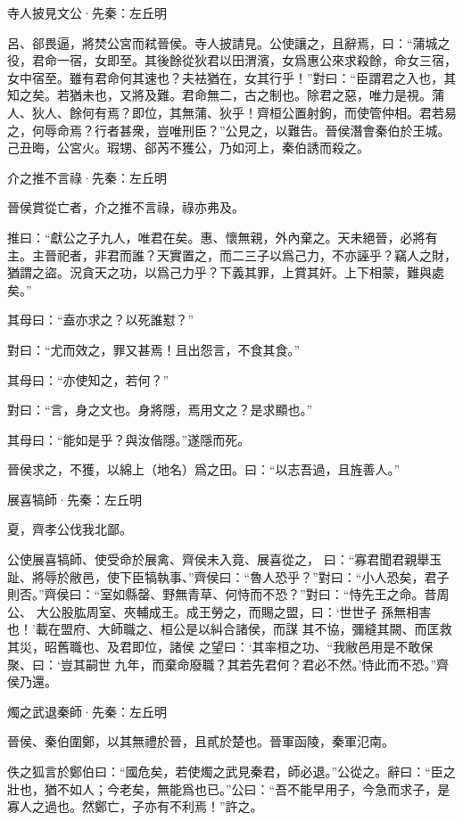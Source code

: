 \documentclass[12pt,a4paper]{ctexbook}
\begin{document}
寺人披見文公·先秦：左丘明 \par
呂、郤畏逼，將焚公宮而弒晉侯。寺人披請見。公使讓之，且辭焉，曰：“蒲城之役，君命一宿，女即至。其後餘從狄君以田渭濱，女爲惠公來求殺餘，命女三宿，女中宿至。雖有君命何其速也？夫袪猶在，女其行乎！”對曰：“臣謂君之入也，其知之矣。若猶未也，又將及難。君命無二，古之制也。除君之惡，唯力是視。蒲人、狄人、餘何有焉？即位，其無蒲、狄乎！齊桓公置射鉤，而使管仲相。君若易之，何辱命焉？行者甚衆，豈唯刑臣？”公見之，以難告。晉侯潛會秦伯於王城。己丑晦，公宮火。瑕甥、郤芮不獲公，乃如河上，秦伯誘而殺之。\par
介之推不言祿·先秦：左丘明 \par
晉侯賞從亡者，介之推不言祿，祿亦弗及。\par
推曰：“獻公之子九人，唯君在矣。惠、懷無親，外內棄之。天未絕晉，必將有主。主晉祀者，非君而誰？天實置之，而二三子以爲己力，不亦誣乎？竊人之財，猶謂之盜。況貪天之功，以爲己力乎？下義其罪，上賞其奸。上下相蒙，難與處矣。”\par
其母曰：“盍亦求之？以死誰懟？”\par
對曰：“尤而效之，罪又甚焉！且出怨言，不食其食。”\par
其母曰：“亦使知之，若何？”\par
對曰：“言，身之文也。身將隱，焉用文之？是求顯也。”\par
其母曰：“能如是乎？與汝偕隱。”遂隱而死。\par
晉侯求之，不獲，以綿上（地名）爲之田。曰：“以志吾過，且旌善人。”\par
展喜犒師·先秦：左丘明 \par
夏，齊孝公伐我北鄙。\par
公使展喜犒師、使受命於展禽、齊侯未入竟、展喜從之， 曰：“寡君聞君親舉玉趾、將辱於敝邑，使下臣犒執事、”齊侯曰：“魯人恐乎？”對曰：“小人恐矣，君子則否。”齊侯曰：“室如縣罄、野無青草、何恃而不恐？”對曰：“恃先王之命。昔周公、 大公股肱周室、夾輔成王。成王勞之，而賜之盟，曰：‘世世子 孫無相害也！’載在盟府、大師職之、桓公是以糾合諸侯，而謀 其不協，彌縫其闕、而匡救其災，昭舊職也、及君即位，諸侯 之望曰：‘其率桓之功、“我敝邑用是不敢保聚、曰：‘豈其嗣世 九年，而棄命廢職？其若先君何？君必不然。’恃此而不恐。”齊侯乃還。\par
燭之武退秦師·先秦：左丘明 \par
晉侯、秦伯圍鄭，以其無禮於晉，且貳於楚也。晉軍函陵，秦軍氾南。\par
佚之狐言於鄭伯曰：“國危矣，若使燭之武見秦君，師必退。”公從之。辭曰：“臣之壯也，猶不如人；今老矣，無能爲也已。”公曰：“吾不能早用子，今急而求子，是寡人之過也。然鄭亡，子亦有不利焉！”許之。\par
\end{document}
